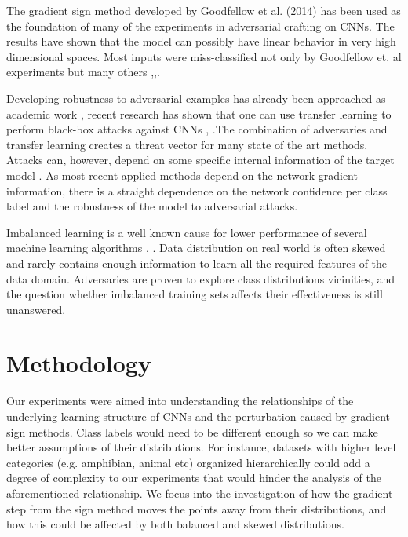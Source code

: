 \documentclass[runningheads,a4paper]{llncs}
\begin{document}
The gradient sign method developed by Goodfellow et al. (2014) has been used as the foundation of many of the experiments in adversarial crafting on CNNs. The results have shown that the model can possibly have linear behavior in very high dimensional spaces.  Most inputs were miss-classified not only by Goodfellow et. al \cite{goodfellow2014}  experiments but many others \cite{billovits},\cite{goodfellow2016},\cite{papernot2016}.

Developing robustness to adversarial examples has already been approached as academic work \cite{billovits}, recent research has shown that one can use transfer learning to perform black-box attacks against CNNs \cite{yosinski2014transferable} , \cite{papernot2016} .The combination of adversaries and transfer learning creates a threat vector for many state of the art methods. Attacks can, however, depend on some specific internal information of the target model \cite{papernot2016transf}. As most recent applied methods depend on the network gradient information, there is a straight dependence on the network confidence per class label and the robustness of the model to adversarial attacks.

Imbalanced learning is a well known cause for lower performance of several machine learning algorithms \cite{japkowicz2002class}, \cite{krawczyk2016learning}. Data distribution on real world is often skewed and rarely contains enough information to learn all the required features of the data domain. Adversaries are proven to explore class distributions vicinities, and the question whether imbalanced training sets affects their effectiveness is still unanswered.

\section{Methodology}

Our experiments were aimed into understanding the relationships of the underlying learning structure of CNNs and the perturbation caused by gradient sign methods. Class labels would need to be different enough so we can make better assumptions of their distributions. For instance, datasets with higher level categories (e.g. amphibian, animal etc) organized hierarchically could add a degree of complexity to our experiments that would hinder the analysis of the aforementioned relationship. We focus into the investigation of how the gradient step from the sign method moves the points away from their distributions, and how this could be affected by both balanced and skewed distributions.
\end{document}
